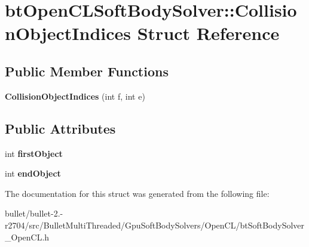 \hypertarget{structbt_open_c_l_soft_body_solver_1_1_collision_object_indices}{\section{bt\+Open\+C\+L\+Soft\+Body\+Solver\+:\+:Collision\+Object\+Indices Struct Reference}
\label{structbt_open_c_l_soft_body_solver_1_1_collision_object_indices}
}
\subsection*{Public Member Functions}
\begin{DoxyCompactItemize}
\item 
\hypertarget{structbt_open_c_l_soft_body_solver_1_1_collision_object_indices_a23285e92cd958fbc91f6e4a2cd98ea1b}{{\bfseries Collision\+Object\+Indices} (int f, int e)}\label{structbt_open_c_l_soft_body_solver_1_1_collision_object_indices_a23285e92cd958fbc91f6e4a2cd98ea1b}

\end{DoxyCompactItemize}
\subsection*{Public Attributes}
\begin{DoxyCompactItemize}
\item 
\hypertarget{structbt_open_c_l_soft_body_solver_1_1_collision_object_indices_a00524289be04be8f381444edd52e661f}{int {\bfseries first\+Object}}\label{structbt_open_c_l_soft_body_solver_1_1_collision_object_indices_a00524289be04be8f381444edd52e661f}

\item 
\hypertarget{structbt_open_c_l_soft_body_solver_1_1_collision_object_indices_ac6cf2fb397e2e87c6cbf7cb7f64b2967}{int {\bfseries end\+Object}}\label{structbt_open_c_l_soft_body_solver_1_1_collision_object_indices_ac6cf2fb397e2e87c6cbf7cb7f64b2967}

\end{DoxyCompactItemize}


The documentation for this struct was generated from the following file\+:\begin{DoxyCompactItemize}
\item 
bullet/bullet-\/2.-\/r2704/src/\+Bullet\+Multi\+Threaded/\+Gpu\+Soft\+Body\+Solvers/\+Open\+C\+L/bt\+Soft\+Body\+Solver\+\_\+\+Open\+C\+L.\+h\end{DoxyCompactItemize}
